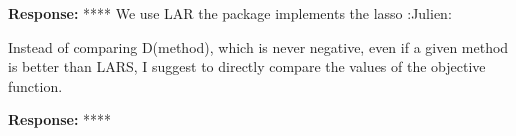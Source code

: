 \documentclass[a4paper,11pt]{texMemo}
\newenvironment{comment}
{
   \par\medskip \color{black}%
   \textbf{Response: }}
{\medskip}
\newenvironment{remark}
{\begin{itshape} \color{gray}}
{\end{itshape}}
\begin{document}
\begin{itemize}
\begin{comment}
**** We use LAR the package implements the lasso :Julien:
\end{comment}


\begin{remark}
Instead of comparing D(method), which is never negative,
even if a given method is better than LARS, 
I suggest to directly compare the values of the objective function.
\end{remark}


\begin{comment}
  ****
\end{comment}

\end{itemize}

 

\end{document}
